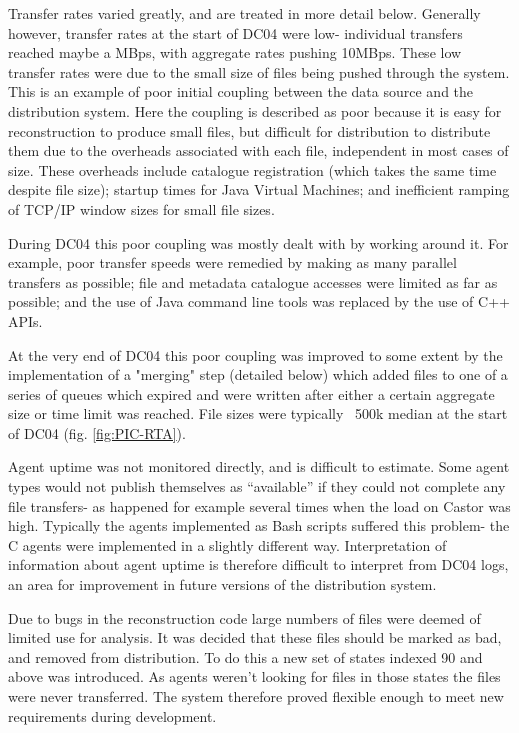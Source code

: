 \documentclass{cmspaper}
\begin{document}
Transfer rates varied greatly, and are treated in more detail
below. Generally however, transfer rates at the start of DC04 were
low- individual transfers reached maybe a MBps, with aggregate rates
pushing 10MBps. These low transfer rates were due to the small size of
files being pushed through the system. This is an example of poor
initial coupling between the data source and the distribution
system. Here the coupling is described as poor because it is easy for
reconstruction to produce small files, but difficult for distribution
to distribute them due to the overheads associated with each file,
independent in most cases of size. These overheads include catalogue
registration (which takes the same time despite file size); startup
times for Java Virtual Machines; and inefficient ramping of TCP/IP
window sizes for small file sizes.

During DC04 this poor coupling was mostly dealt with by working around
it. For example, poor transfer speeds were remedied by making as many
parallel transfers as possible; file and metadata catalogue accesses
were limited as far as possible; and the use of Java command line
tools was replaced by the use of C++ APIs.

At the very end of DC04 this poor coupling was improved to some extent
by the implementation of a "merging" step (detailed below) which added
files to one of a series of queues which expired and were written
after either a certain aggregate size or time limit was reached. File
sizes were typically ~500k median at the start of DC04
(fig. \ref{fig:PIC-RTA}).

Agent uptime was not monitored directly, and is difficult to
estimate. Some agent types would not publish themselves as
``available'' if they could not complete any file transfers- as
happened for example several times when the load on Castor was
high. Typically the agents implemented as Bash scripts suffered this
problem- the C agents were implemented in a slightly different way.
Interpretation of information about agent uptime is therefore
difficult to interpret from DC04 logs, an area for improvement in
future versions of the distribution system.

Due to bugs in the reconstruction code large numbers of files were
deemed of limited use for analysis. It was decided that these files
should be marked as bad, and removed from distribution. To do this a
new set of states indexed 90 and above was introduced. As agents
weren't looking for files in those states the files were never
transferred. The system therefore proved flexible enough to meet new
requirements during development.
\end{document}
